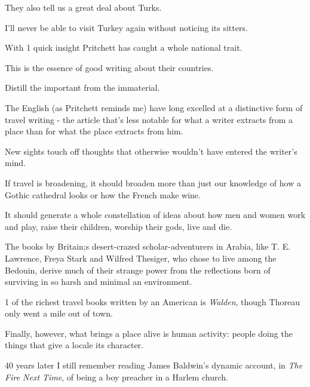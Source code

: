 \documentclass{book}
\numberwithin{equation}{section}
\begin{document}
They also tell us a great deal about Turks.

I'll never be able to visit Turkey again without noticing its sitters.

With 1 quick insight Pritchett has caught a whole national trait.

This is the essence of good writing about their countries.

Distill the important from the immaterial.

%
The English (as Pritchett reminds me) have long excelled at a distinctive form of travel writing - the article that's less notable for what a writer extracts from a place than for what the place extracts from him.

New sights touch off thoughts that otherwise wouldn't have entered the writer's mind.

If travel is broadening, it should broaden more than just our knowledge of how a Gothic cathedral looks or how the French make wine.

It should generate a whole constellation of ideas about how men and women work and play, raise their children, worship their gods, live and die.

The books by Britain;s desert-crazed scholar-adventurers in Arabia, like T. E. Lawrence, Freya Stark and Wilfred Thesiger, who chose to live among the Bedouin, derive much of their strange power from the reflections born of surviving in so harsh and minimal an environment.



1 of the richest travel books written by an American is \textit{Walden}, though Thoreau only went a mile out of town.

%
Finally, however, what brings a place alive is human activity: people doing the things that give a locale its character.

40 years later I still remember reading James Baldwin's dynamic account, in \textit{The Fire Next Time}, of being a boy preacher in a Harlem church.
\end{document}
